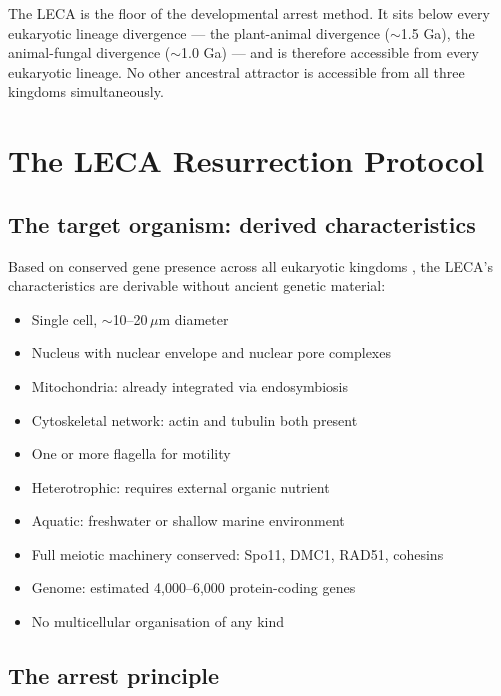 \documentclass[12pt, a4paper]{article}
\theoremstyle{definition}
\theoremstyle{remark}
\begin{document}
The LECA is the floor of the developmental arrest method.
It sits below every eukaryotic lineage divergence --- the
plant-animal divergence ($\sim$1.5 Ga), the animal-fungal
divergence ($\sim$1.0 Ga) --- and is therefore accessible
from every eukaryotic lineage. No other ancestral attractor
is accessible from all three kingdoms simultaneously.

\section{The LECA Resurrection Protocol}

\subsection{The target organism: derived characteristics}

Based on conserved gene presence across all eukaryotic
kingdoms \cite{luca2024}, the LECA's characteristics are
derivable without ancient genetic material:

\begin{itemize}[noitemsep]
  \item Single cell, $\sim$10--20\,$\mu$m diameter
  \item Nucleus with nuclear envelope and nuclear pore
        complexes
  \item Mitochondria: already integrated via endosymbiosis
  \item Cytoskeletal network: actin and tubulin both present
  \item One or more flagella for motility
  \item Heterotrophic: requires external organic nutrient
  \item Aquatic: freshwater or shallow marine environment
  \item Full meiotic machinery conserved:
        Spo11, DMC1, RAD51, cohesins
  \item Genome: estimated 4,000--6,000 protein-coding genes
  \item No multicellular organisation of any kind
\end{itemize}

\subsection{The arrest principle}
\end{document}
